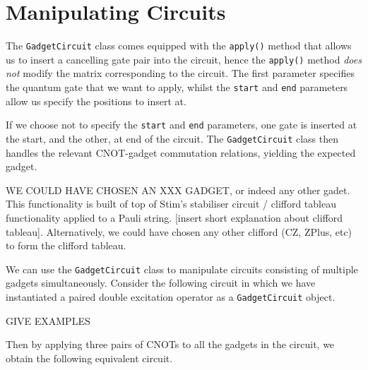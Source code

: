 \section{Manipulating Circuits}

The \lstinline{GadgetCircuit} class comes equipped with the \lstinline{apply()} method that allows us to insert a cancelling gate pair into the circuit, hence the \lstinline{apply()} method \textit{does not} modify the matrix corresponding to the circuit. The first parameter specifies the quantum gate that we want to apply, whilst the \lstinline{start} and \lstinline{end} parameters allow us specify the positions to insert at. 


If we choose not to specify the \lstinline{start} and \lstinline{end} parameters, one gate is inserted at the start, and the other, at end of the circuit. The \lstinline{GadgetCircuit} class then handles the relevant CNOT-gadget commutation relations, yielding the expected gadget.


WE COULD HAVE CHOSEN AN XXX GADGET, or indeed any other gadet. This functionality is built of top of Stim's stabiliser circuit / clifford tableau functionality applied to a Pauli string. [insert short explanation about clifford tableau]. Alternatively, we could have chosen any other clifford (CZ, ZPlus, etc) to form the clifford tableau.


We can use the \lstinline{GadgetCircuit} class to manipulate circuits consisting of multiple gadgets simultaneously. Consider the following circuit in which we have instantiated a paired double excitation operator as a \lstinline{GadgetCircuit} object.

GIVE EXAMPLES


Then by applying three pairs of CNOTs to all the gadgets in the circuit, we obtain the following equivalent circuit.

